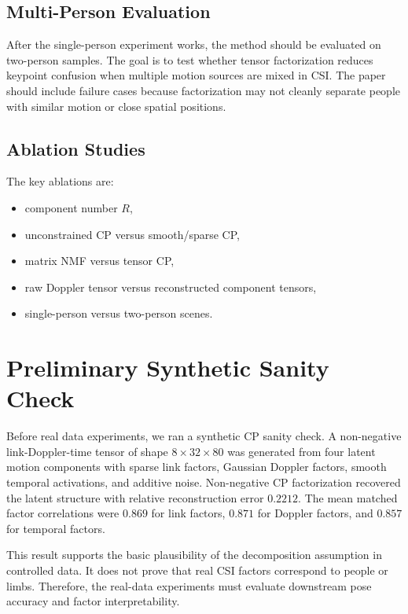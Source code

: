 \documentclass[10pt,journal]{IEEEtran}
\begin{document}
\subsection{Multi-Person Evaluation}

After the single-person experiment works, the method should be evaluated on two-person samples. The goal is to test whether tensor factorization reduces keypoint confusion when multiple motion sources are mixed in CSI. The paper should include failure cases because factorization may not cleanly separate people with similar motion or close spatial positions.

\subsection{Ablation Studies}

The key ablations are:
\begin{itemize}
    \item component number $R$,
    \item unconstrained CP versus smooth/sparse CP,
    \item matrix NMF versus tensor CP,
    \item raw Doppler tensor versus reconstructed component tensors,
    \item single-person versus two-person scenes.
\end{itemize}

\section{Preliminary Synthetic Sanity Check}

Before real data experiments, we ran a synthetic CP sanity check. A non-negative link-Doppler-time tensor of shape $8\times32\times80$ was generated from four latent motion components with sparse link factors, Gaussian Doppler factors, smooth temporal activations, and additive noise. Non-negative CP factorization recovered the latent structure with relative reconstruction error $0.2212$. The mean matched factor correlations were $0.869$ for link factors, $0.871$ for Doppler factors, and $0.857$ for temporal factors.

This result supports the basic plausibility of the decomposition assumption in controlled data. It does not prove that real CSI factors correspond to people or limbs. Therefore, the real-data experiments must evaluate downstream pose accuracy and factor interpretability.
\end{document}
